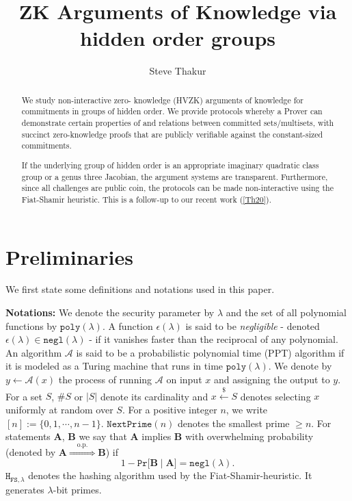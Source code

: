 \documentclass[11pt, lettersize, notitlepage, leqno, footskip=0.6cm]{article}
\newcommand{\ttt}{\texttt}
\newcommand{\negl}{\ttt{{negl}}}
\newcommand{\impop}{\overset{\;\;\;\;\mr{o.p.}\;\;\;\;}{\Longrightarrow}}
\newcommand{\mc}{\mathcal}
\newcommand{\mbf}{\mathbf}
\newcommand{\mr}{\mathrm}
\newcommand{\lam}{\lambda}
\newcommand{\vs}{\vspace{-0.15cm}}
\newcommand{\noin}{\noindent}
\newcommand{\op}{overwhelming probability}
\numberwithin{equation}{section}
\begin{document}
 
\title{ZK Arguments of Knowledge via hidden order groups}
\author{Steve Thakur}
\affil{}
\date{\vspace{-6ex}}
 
\maketitle

\begin{abstract} We study non-interactive zero- knowledge (HVZK) arguments of knowledge for commitments in groups of hidden order. We provide protocols whereby a Prover can demonstrate certain properties of and relations between committed sets/multisets, with succinct zero-knowledge proofs that are publicly verifiable against the constant-sized commitments. 

If the underlying group of hidden order is an appropriate imaginary quadratic class group or a genus three Jacobian, the argument systems are transparent. Furthermore, since all challenges are public coin, the protocols can be made non-interactive using the Fiat-Shamir heuristic. This is a follow-up to our recent work (\hyperlink{Th20}{[Th20]}).\end{abstract}

\section{\fontsize{12}{12}\selectfont Preliminaries}

\noin We first state some definitions and notations used in this paper. \vspace{0.15cm}

\noin \textbf{Notations:} We denote the security parameter by $\lam$ and the set of all polynomial functions by $\ttt{poly}(\lam)$. A function $\epsilon(\lam)$ is said to be \textit{negligible} - denoted $\epsilon(\lam)\in \ttt{negl}(\lam)$ - if it vanishes faster than the reciprocal of any polynomial. An algorithm $\mc{A}$ is said to be a probabilistic polynomial time  (PPT) algorithm if it is modeled as a Turing machine that runs in time $\ttt{poly}(\lam)$. We denote by $y\gets \mc{A}(x)$ the process of running $\mc{A}$ on input $x$ and assigning the output to $y$. For a set $S$, $\# S$ or $|S|$ denote its cardinality and $x\xleftarrow{\$} S$ denotes selecting $x$ uniformly at random over $S$. For a positive integer $n$, we write $[n]:=\{0,1,\cdots,n-1\}$.  $\ttt{NextPrime}(n)$ denotes the smallest prime $\geq n$. For statements $\mbf{A}$, $\mbf{B}$ we say that $\mbf{A}$ implies $\mbf{B}$ with \op\;  (denoted by $\mbf{A}\impop \mbf{B}$) if \vs $$1 - \ttt{Pr}\big[\mbf{B}\;\big|\;\mbf{A}\big] = \negl(\lam).$$ $\ttt{H}_{\ttt{FS},\lam}$ denotes the hashing algorithm used by the Fiat-Shamir-heuristic. It generates $\lam$-bit primes.
\end{document}
